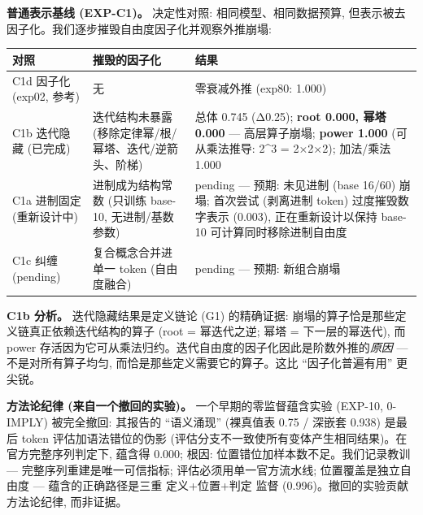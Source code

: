 \documentclass[
]{article}
\begin{document}
\textbf{普通表示基线 (EXP-C1)。} 决定性对照: 相同模型、相同数据预算,
但表示被去因子化。我们逐步摧毁自由度因子化并观察外推崩塌:

\begin{longtable}[]{@{}
  >{\raggedright\arraybackslash}p{}
  >{\raggedright\arraybackslash}p{}
  >{\raggedright\arraybackslash}p{}@{}}
\toprule\noalign{}
\begin{minipage}[b]{\linewidth}\raggedright
对照
\end{minipage} & \begin{minipage}[b]{\linewidth}\raggedright
摧毁的因子化
\end{minipage} & \begin{minipage}[b]{\linewidth}\raggedright
结果
\end{minipage} \\
\midrule\noalign{}
\endhead
\bottomrule\noalign{}
\endlastfoot
C1d 因子化 (exp02, 参考) & 无 & 零衰减外推 (exp80: 1.000) \\
C1b 迭代隐藏 (已完成) & 迭代结构未暴露
(移除定律幂/根/幂塔、迭代/逆箭头、阶梯) & 总体 0.745 (Δ0.25);
\textbf{root 0.000, 幂塔 0.000} --- 高层算子崩塌; \textbf{power 1.000}
(可从乘法推导: 2\^{}3 = 2×2×2); 加法/乘法 1.000 \\
C1a 进制固定 (重新设计中) & 进制成为结构常数 (只训练 base-10,
无进制/基数参数) & pending --- 预期: 未见进制 (base 16/60) 崩塌;
首次尝试 (剥离进制 token) 过度摧毁数字表示 (0.003), 正在重新设计以保持
base-10 可计算同时移除进制自由度 \\
C1c 纠缠 (pending) & 复合概念合并进单一 token (自由度融合) & pending ---
预期: 新组合崩塌 \\
\end{longtable}

\textbf{C1b 分析。} 迭代隐藏结果是定义链论 (G1) 的精确证据:
崩塌的算子恰是那些定义链真正依赖迭代结构的算子 (root = 幂迭代之逆; 幂塔
= 下一层的幂迭代), 而 power
存活因为它可从乘法归约。迭代自由度的因子化因此是阶数外推的\emph{原因}
--- 不是对所有算子均匀, 而恰是那些定义需要它的算子。这比
``因子化普遍有用'' 更尖锐。

\textbf{方法论纪律 (来自一个撤回的实验)。} 一个早期的零监督蕴含实验
(EXP-10, 0-IMPLY) 被完全撤回: 其报告的 ``语义涌现'' (裸真值表 0.75 /
深嵌套 0.938) 是最后 token 评估加语法错位的伪影
(评估分支不一致使所有变体产生相同结果)。在官方完整序列判定下, 蕴含得
0.000; 根因: 位置错位加样本数不足。我们记录教训 ---
完整序列重建是唯一可信指标; 评估必须用单一官方流水线;
位置覆盖是独立自由度 --- 蕴含的正确路径是三重 定义+位置+判定 监督
(0.996)。撤回的实验贡献方法论纪律, 而非证据。
\end{document}
